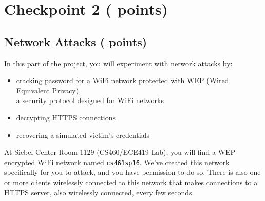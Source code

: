   \setcounter{pts-wep}{10}
 \setcounter{pts-wifiip}{6}
 \setcounter{pts-protocol}{12}
 \setcounter{pts-cred}{20}
 \setcounter{pts-secret}{10}
 \setcounter{pts-jailtime}{2}
\setcounter{pts-cp2.1}{
    \value{pts-wep}+\value{pts-wifiip}+\value{pts-protocol}+\value{pts-cred}+\value{pts-secret}+\value{pts-jailtime}
}
 \setcounter{pts-cp2.2}{40}
\setcounter{pts-cp2}{\value{pts-cp2.1}+\value{pts-cp2.2}}

\section{Checkpoint 2 ( points)}
\label{sec:cp2}

\subsection{Network Attacks ( points)}
\label{sec:cp2.1}
\newcommand{\filewep}{\ref*{sec:cp2.1}.\ref*{itm:wep}.txt}
\newcommand{\filewifiip}{\ref*{sec:cp2.1}.\ref*{itm:wifiip}.txt}
\newcommand{\fileprotocol}{\ref*{sec:cp2.1}.\ref*{itm:protocol}.txt}
\newcommand{\filecred}{\ref*{sec:cp2.1}.\ref*{itm:cred}.txt}
\newcommand{\filesecret}{\ref*{sec:cp2.1}.\ref*{itm:secret}.txt}
\newcommand{\filejailtime}{\ref*{sec:cp2.1}.\ref*{itm:jailtime}.txt}

In this part of the project, you will experiment with network attacks by:

\begin{itemize}[nosep]
  \item cracking password for a WiFi network protected with WEP (Wired Equivalent Privacy),\\a security protocol designed for WiFi networks
  \item decrypting HTTPS connections
  \item recovering a simulated victim's credentials
\end{itemize}

\medskip

At Siebel Center Room 1129 (CS460/ECE419 Lab), you will find a WEP-encrypted WiFi network named \texttt{cs461sp16}.
We've created this network specifically for you to attack, and you have permission to do so.
There is also one or more clients wirelessly connected to this network that makes connections to a HTTPS server, also wirelessly connected, every few seconds.

